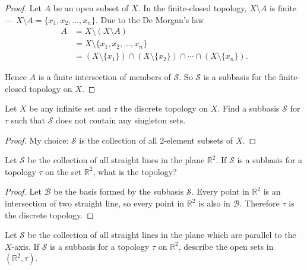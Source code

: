 \begin{proof}
	Let $A$ be an open subset of $X$. In the finite-closed topology, $X\setminus A$ is finite --- $X\setminus A = \{ x_{1}, x_{2}, \ldots, x_{n} \}$. Due to the De Morgan's law
	\begin{align*}
		A & = X\setminus (X\setminus A)                                                              \\
		  & = X\setminus \{ x_{1}, x_{2}, \ldots, x_{n} \}                                           \\
		  & = (X\setminus\{x_{1}\})\cap (X\setminus\{x_{2}\})\cap \cdots \cap (X\setminus\{x_{n}\}).
	\end{align*}

	Hence $A$ is a finite intersection of members of $\mathcal{S}$. So $\mathcal{S}$ is a subbasis for the finite-closed topology on $X$.
\end{proof}
\newpage

\begin{exercise}
	Let $X$ be any infinite set and $\tau$ the discrete topology on $X$. Find a subbasis $\mathcal{S}$ for $\tau$ such that $\mathcal{S}$ does not contain any singleton sets.
\end{exercise}

\begin{proof}
	My choice: $\mathcal{S}$ is the collection of all $2$-element subsets of $X$.
\end{proof}
\newpage

\begin{exercise}
	Let $\mathcal{S}$ be the collection of all straight lines in the plane $\mathbb{R}^{2}$. If $\mathcal{S}$ is a subbasis for a topology $\tau$ on the set $\mathbb{R}^{2}$, what is the topology?
\end{exercise}

\begin{proof}
	Let $\mathcal{B}$ be the basis formed by the subbasis $\mathcal{S}$. Every point in $\mathbb{R}^{2}$ is an intersection of two straight line, so every point in $\mathbb{R}^{2}$ is also in $\mathcal{B}$. Therefore $\tau$ is the discrete topology.
\end{proof}
\newpage

\begin{exercise}
	Let $\mathcal{S}$ be the collection of all straight lines in the plane which are parallel to the $X$-axis. If $\mathcal{S}$ is a subbasis for a topology $\tau$ on $\mathbb{R}^{2}$, describe the open sets in $(\mathbb{R}^{2}, \tau)$.
\end{exercise}

